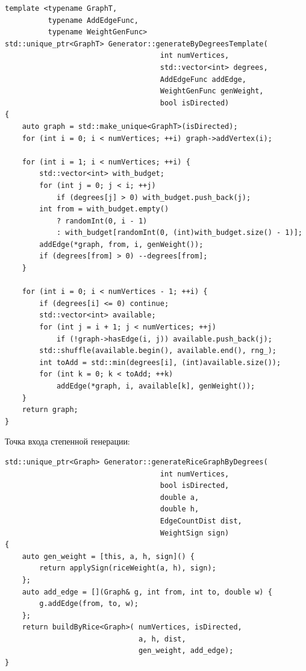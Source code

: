 \begin{lstlisting}[style=cppstyle, caption={Построение графа по целевым степеням (Generator.tpp)}]
template <typename GraphT,
          typename AddEdgeFunc,
          typename WeightGenFunc>
std::unique_ptr<GraphT> Generator::generateByDegreesTemplate(
                                    int numVertices,
                                    std::vector<int> degrees,
                                    AddEdgeFunc addEdge,
                                    WeightGenFunc genWeight,
                                    bool isDirected)
{
    auto graph = std::make_unique<GraphT>(isDirected);
    for (int i = 0; i < numVertices; ++i) graph->addVertex(i);

    for (int i = 1; i < numVertices; ++i) {
        std::vector<int> with_budget;
        for (int j = 0; j < i; ++j)
            if (degrees[j] > 0) with_budget.push_back(j);
        int from = with_budget.empty()
            ? randomInt(0, i - 1)
            : with_budget[randomInt(0, (int)with_budget.size() - 1)];
        addEdge(*graph, from, i, genWeight());
        if (degrees[from] > 0) --degrees[from];
    }

    for (int i = 0; i < numVertices - 1; ++i) {
        if (degrees[i] <= 0) continue;
        std::vector<int> available;
        for (int j = i + 1; j < numVertices; ++j)
            if (!graph->hasEdge(i, j)) available.push_back(j);
        std::shuffle(available.begin(), available.end(), rng_);
        int toAdd = std::min(degrees[i], (int)available.size());
        for (int k = 0; k < toAdd; ++k)
            addEdge(*graph, i, available[k], genWeight());
    }
    return graph;
}
\end{lstlisting}

Точка входа степенной генерации:

\begin{lstlisting}[style=cppstyle, caption={generateRiceGraphByDegrees (Generator.cc)}]
std::unique_ptr<Graph> Generator::generateRiceGraphByDegrees(
                                    int numVertices,
                                    bool isDirected,
                                    double a,
                                    double h,
                                    EdgeCountDist dist,
                                    WeightSign sign)
{
    auto gen_weight = [this, a, h, sign]() {
        return applySign(riceWeight(a, h), sign);
    };
    auto add_edge = [](Graph& g, int from, int to, double w) {
        g.addEdge(from, to, w);
    };
    return buildByRice<Graph>( numVertices, isDirected,
                               a, h, dist,
                               gen_weight, add_edge);
}
\end{lstlisting}

